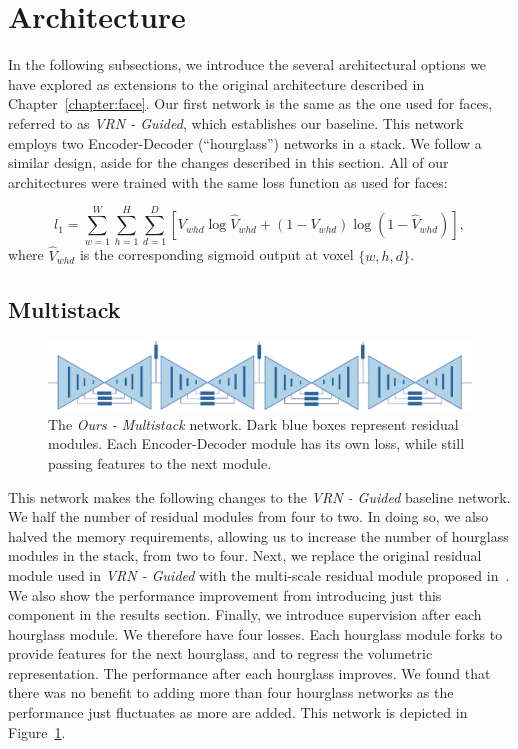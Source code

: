 \section{Architecture}

In the following subsections, we introduce the several architectural
options we have explored as extensions to the original architecture
described in Chapter~\ref{chapter:face}. Our first network is the same
as the one used for faces, referred to as \textit{VRN - Guided}, which
establishes our baseline. This network employs two Encoder-Decoder
(``hourglass'') networks in a stack. We follow a similar design, aside
for the changes described in this section. All of our architectures
were trained with the same loss function as used for faces:

\begin{equation}
  l_{1} = \sum\limits_{w=1}^{W} \sum\limits_{h=1}^{H}\sum\limits_{d=1}^{D}[V_{whd}\log \widehat{V}_{whd}+(1-V_{whd})\log(1-\widehat{V}
_{whd})],
\end{equation}
where $\widehat{V}_{whd}$ is the corresponding sigmoid output at voxel
$\{w,h,d\}$.

\subsection{Multistack}

\begin{figure}
  \includegraphics[width=\linewidth]{img/multistack.pdf}
  \caption[Proposed stacked architecture]{The \textit{Ours -
      Multistack} network. Dark blue boxes represent residual
    modules. Each Encoder-Decoder module has its own loss, while still
    passing features to the next module.}
  \label{fig:multistack}
\end{figure}


This network makes the following changes to the \textit{VRN - Guided}
baseline network. We half the number of residual modules from four to
two. In doing so, we also halved the memory requirements, allowing us
to increase the number of hourglass modules in the stack, from two to
four. Next, we replace the original residual module used in
\textit{VRN - Guided} with the multi-scale residual module proposed
in~\cite{bulat2017binarized}. We also show the performance improvement
from introducing just this component in the results section. Finally,
we introduce supervision after each hourglass module. We therefore
have four losses. Each hourglass module forks to provide features for
the next hourglass, and to regress the volumetric representation. The
performance after each hourglass improves. We found that there was no
benefit to adding more than four hourglass networks as the performance
just fluctuates as more are added. This network is depicted in
Figure~\ref{fig:multistack}.

